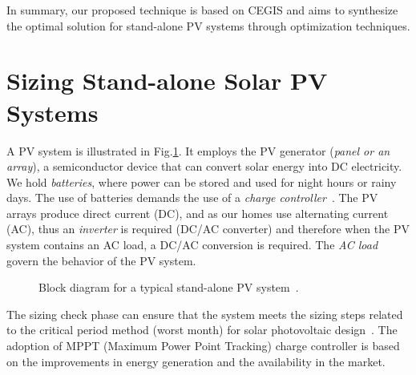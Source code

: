 \documentclass[review]{elsarticle}
\begin{document}
In summary, our proposed technique is based on CEGIS and aims to synthesize the optimal solution for stand-alone PV systems through optimization techniques.

\section{Sizing Stand-alone Solar PV Systems}
\label{sec:sizing}
A PV system is illustrated in Fig.\ref{fig:blockdiagram}. It employs the PV generator (\textit{panel or an array}), a semiconductor device that can convert solar energy into DC electricity. We hold \textit{batteries}, where power can be stored and used for night hours or rainy days. The use of batteries demands the use of a \textit{charge controller}~\citep{Hansen}. The PV arrays produce direct current (DC), and as our homes use alternating current (AC), thus an \textit{inverter} is required (DC/AC converter) and therefore when the PV system contains an AC load, a DC/AC conversion is required. The \textit{AC load} govern the behavior of the PV system.
%
\begin{figure}[ht]
\centering
\caption{Block diagram for a typical stand-alone PV system~\citep{Hansen}.}
\label{fig:blockdiagram} 
\end{figure}
 
The sizing check phase can ensure that the system meets the sizing steps related to the critical period method (worst month) for solar photovoltaic design~\citep{Pinho}. The adoption of MPPT (Maximum Power Point Tracking) charge controller is based on the improvements in energy generation and the availability in the market. 
 
\end{document}
